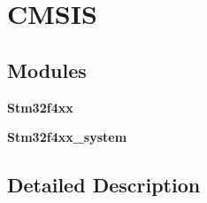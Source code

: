 \section{C\+M\+S\+IS}
\label{group__CMSIS}
\subsection*{Modules}
\begin{DoxyCompactItemize}
\item 
\textbf{ Stm32f4xx}
\item 
\textbf{ Stm32f4xx\+\_\+system}
\end{DoxyCompactItemize}


\subsection{Detailed Description}
